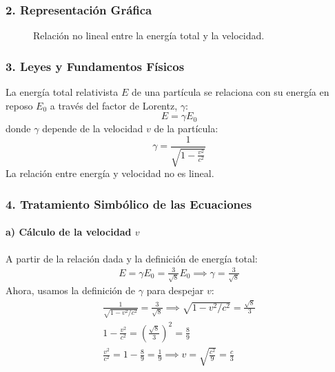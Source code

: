\subsubsection*{2. Representación Gráfica}
\begin{figure}[H]
    \centering
    \caption{Relación no lineal entre la energía total y la velocidad.}
\end{figure}

\subsubsection*{3. Leyes y Fundamentos Físicos}
La energía total relativista $E$ de una partícula se relaciona con su energía en reposo $E_0$ a través del factor de Lorentz, $\gamma$:
$$ E = \gamma E_0 $$
donde $\gamma$ depende de la velocidad $v$ de la partícula:
$$ \gamma = \frac{1}{\sqrt{1 - \frac{v^2}{c^2}}} $$
La relación entre energía y velocidad no es lineal.

\subsubsection*{4. Tratamiento Simbólico de las Ecuaciones}
\paragraph*{a) Cálculo de la velocidad $v$}
A partir de la relación dada y la definición de energía total:
\begin{gather}
    E = \gamma E_0 = \frac{3}{\sqrt{8}} E_0 \implies \gamma = \frac{3}{\sqrt{8}}
\end{gather}
Ahora, usamos la definición de $\gamma$ para despejar $v$:
\begin{gather}
    \frac{1}{\sqrt{1 - v^2/c^2}} = \frac{3}{\sqrt{8}} \implies \sqrt{1 - v^2/c^2} = \frac{\sqrt{8}}{3} \nonumber \\
    1 - \frac{v^2}{c^2} = \left(\frac{\sqrt{8}}{3}\right)^2 = \frac{8}{9} \nonumber \\
    \frac{v^2}{c^2} = 1 - \frac{8}{9} = \frac{1}{9} \implies v = \sqrt{\frac{c^2}{9}} = \frac{c}{3}
\end{gather}

